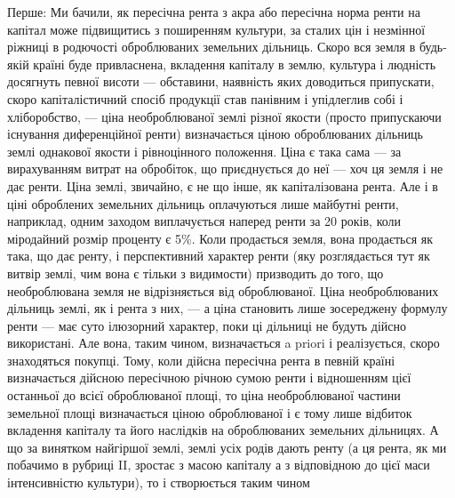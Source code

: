 Перше: Ми бачили, як пересічна рента з акра або пересічна норма
ренти на капітал може підвищитись з поширенням культури, за сталих цін і
незмінної ріжниці в родючості оброблюваних земельних дільниць. Скоро вся
земля в будь-якій країні буде привласнена, вкладення капіталу в землю, культура
і людність досягнуть певної висоти — обставини, наявність яких доводиться
припускати, скоро капіталістичний спосіб продукції став панівним і упідлеглив
собі і хліборобство, — ціна необроблюваної землі різної якости (просто припускаючи
існування диференційної ренти) визначається ціною оброблюваних дільниць
землі однакової якости і рівноцінного положення. Ціна є така сама — за вирахуванням
витрат на обробіток, що приєднується до неї — хоч ця земля і не
дає ренти. Ціна землі, звичайно, є не що інше, як капіталізована рента. Але
і в ціні оброблених земельних дільниць оплачуються лише майбутні ренти, наприклад,
одним заходом виплачується наперед ренти за 20 років, коли міродайний
розмір проценту є 5\%. Коли продається земля, вона продається як така, що дає
ренту, і перспективний характер ренти (яку розглядається тут як витвір землі, чим
вона є тільки з видимости) призводить до того, що необроблювана земля не
відрізняється від оброблюваної. Ціна необроблюваних дільниць землі, як і рента
з них, — а ціна становить лише зосереджену формулу ренти — має суто ілюзорний
характер, поки ці дільниці не будуть дійсно використані. Але вона, таким
чином, визначається a priori і реалізується, скоро знаходяться покупці. Тому,
коли дійсна пересічна рента в певній країні визначається дійсною пересічною
річною сумою ренти і відношенням цієї останньої до всієї оброблюваної площі,
то ціна необроблюваної частини земельної площі визначається ціною оброблюваної
і є тому лише відбиток вкладення капіталу та його наслідків на оброблюваних
земельних дільницях. А що за винятком найгіршої землі, землі усіх родів
дають ренту (а ця рента, як ми побачимо в рубриці II, зростає з масою капіталу
а з відповідною до цієї маси інтенсивністю культури), то і створюється таким чином
\parbreak{}  %
